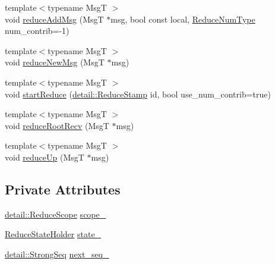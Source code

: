 \begin{DoxyCompactItemize}
{\footnotesize template$<$typename MsgT $>$ }\\void \hyperlink{structvt_1_1collective_1_1reduce_1_1_reduce_a18df32ceadd6b55979c8fd7e85f613e4}{reduce\+Add\+Msg} (MsgT $\ast$msg, bool const local, \hyperlink{structvt_1_1collective_1_1reduce_1_1_reduce_a6c3e63aca10c31d2823b0b18cf9762a4}{Reduce\+Num\+Type} num\+\_\+contrib=-\/1)
\item 
{\footnotesize template$<$typename MsgT $>$ }\\void \hyperlink{structvt_1_1collective_1_1reduce_1_1_reduce_a0642df1a1e52d7da269d8fb23dfc193f}{reduce\+New\+Msg} (MsgT $\ast$msg)
\item 
{\footnotesize template$<$typename MsgT $>$ }\\void \hyperlink{structvt_1_1collective_1_1reduce_1_1_reduce_ad8849fa013a4b3e3f795ceeb103026e4}{start\+Reduce} (\hyperlink{namespacevt_1_1collective_1_1reduce_1_1detail_aacc1fcd729d934ba143fee3a943bf9e7}{detail\+::\+Reduce\+Stamp} id, bool use\+\_\+num\+\_\+contrib=true)
\item 
{\footnotesize template$<$typename MsgT $>$ }\\void \hyperlink{structvt_1_1collective_1_1reduce_1_1_reduce_a48c7bb604fade1b64b9b391f4091ad5b}{reduce\+Root\+Recv} (MsgT $\ast$msg)
\item 
{\footnotesize template$<$typename MsgT $>$ }\\void \hyperlink{structvt_1_1collective_1_1reduce_1_1_reduce_a2bae42586b143c42c731bcd9c96d4426}{reduce\+Up} (MsgT $\ast$msg)
\end{DoxyCompactItemize}
\subsection*{Private Attributes}
\begin{DoxyCompactItemize}
\item 
\hyperlink{structvt_1_1collective_1_1reduce_1_1detail_1_1_reduce_scope}{detail\+::\+Reduce\+Scope} \hyperlink{structvt_1_1collective_1_1reduce_1_1_reduce_a70ebc22c7420905f3e178dccb126c435}{scope\+\_\+}
\item 
\hyperlink{structvt_1_1collective_1_1reduce_1_1_reduce_state_holder}{Reduce\+State\+Holder} \hyperlink{structvt_1_1collective_1_1reduce_1_1_reduce_a49b9fcaf2f8b76d350d1e3b809add2aa}{state\+\_\+}
\item 
\hyperlink{namespacevt_1_1collective_1_1reduce_1_1detail_affec2854d7d65bafb17eb259714e9443}{detail\+::\+Strong\+Seq} \hyperlink{structvt_1_1collective_1_1reduce_1_1_reduce_a368873db0ddebf8365fdd3021927a691}{next\+\_\+seq\+\_\+}
\end{DoxyCompactItemize}



